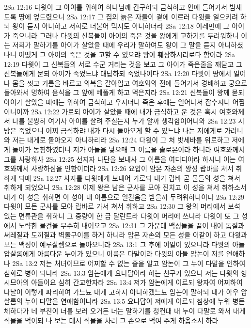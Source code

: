 2Sa 12:16  다윗이 그 아이를 위하여 하나님께 간구하되 금식하고 안에 들어가서 밤새도록 땅에 엎드렸으니
2Sa 12:17  그 집의 늙은 자들이 곁에 이르러 다윗을 일으키려 하되 왕이 듣지 아니하고 저희로 더불어 먹지도 아니하더라
2Sa 12:18  이레만에 그 아이가 죽으니라 그러나 다윗의 신복들이 아이의 죽은 것을 왕에게 고하기를 두려워하니 이는 저희가 말하기를 아이가 살았을 때에 우리가 말하여도 왕이 그 말을 듣지 아니하셨나니 어뗬게 그 아이의 죽은 것을 고할 수 있으랴 왕이 훼상하시리로다 함이라
2Sa 12:19  다윗이 그 신복들의 서로 수군 거리는 것을 보고 그 아이가 죽은줄을 깨닫고 그 신복들에게 묻되 아이가 죽었느냐 대답하되 죽었나이다
2Sa 12:20  다윗이 땅에서 일어나 몸을 씻고 기름을 바르고 의복을 갈아입고 여호와의 전에 들어가서 경배하고 궁으로 돌아와서 명하여 음식을 그 앞에 베풀게 하고 먹은지라
2Sa 12:21  신복들이 왕께 묻되 아이가 살았을 때에는 위하여 금식하고 우시더니 죽은 후에는 일어나서 잡수시니 어찜이니이까
2Sa 12:22  가로되 아이가 살았을 때에 내가 금식하고 운 것은 혹시 여호와께서 나를 불쌍히 여기사 아이를 살려 주실는지 누가 알까 생각함이어니와
2Sa 12:23  시방은 죽었으니 어찌 금식하랴 내가 다시 돌아오게 할 수 있느냐 나는 저에게로 가려니와 저는 내게로 돌아오지 아니하리라
2Sa 12:24  다윗이 그 처 밧세바를 위로하고 저에게 들어가 동침하였더니 저가 아들을 낳으매 그 이름을 솔로몬이라 하니라 여호와께서 그를 사랑하사
2Sa 12:25  선지자 나단을 보내사 그 이름을 여디디야라 하시니 이는 여호와께서 사랑하심을 인함이더라
2Sa 12:26  요압이 암몬 자손의 왕성 랍바를 쳐서 취하게 되매
2Sa 12:27  사자를 다윗에게 보내어 가로되 내가 랍바 곧 물들의 성을 쳐서 취하게 되었으니
2Sa 12:28  이제 왕은 남은 군사를 모아 진치고 이 성을 쳐서 취하소서 내가 이 성을 취하면 이 성이 내 이름으로 일컬음을 받을까 두려워하나이다
2Sa 12:29  다윗이 모든 군사를 모아 랍바로 가서 쳐서 취하고
2Sa 12:30  그 왕의 머리에서 보석 있는 면류관을 취하니 그 중량이 한 금 달란트라 다윗이 머리에 쓰니라 다윗이 또 그 성에서 노략한 물건을 무수히 내어오고
2Sa 12:31  그 가운데 백성들을 끌어 내어 톱질과 써레질과 도끼질과 벽돌구이를 하게 하니라 암몬 자손의 모든 성을 이같이 하고 다윗과 모든 백성이 예루살렘으로 돌아오니라
2Sa 13:1  그 후에 이일이 있으니라 다윗의 아들 압살롬에게 아름다운 누이가 있으니 이름은 다말이라 다윗의 아들 암논이 저를 연애하나
2Sa 13:2  저는 처녀이므로 어찌할 수 없는 줄을 알고 암논이 그 누이 다말을 인하여 심화로 병이 되니라
2Sa 13:3  암논에게 요나답이라 하는 친구가 있으니 저는 다윗의 형 시므아의 아들이요 심히 간교한자라
2Sa 13:4  저가 암논에게 이르되 왕자여 어찌하여 나날이 이렇게 파리하여 가느뇨 내게 고하지 아니하겠느뇨 암논이 말하되 내가 아우 압살롬의 누이 다말을 연애함이니라
2Sa 13:5  요나답이 저에게 이르되 침상에 누워 병든 체하다가 네 부친이 너를 보러 오거든 너는 말하기를 청컨대 내 누이 다말로 와서 내게 식물을 먹이되 나 보는 데서 식물을 차려 그 손으로 먹여 주게 하옵소서 하라

